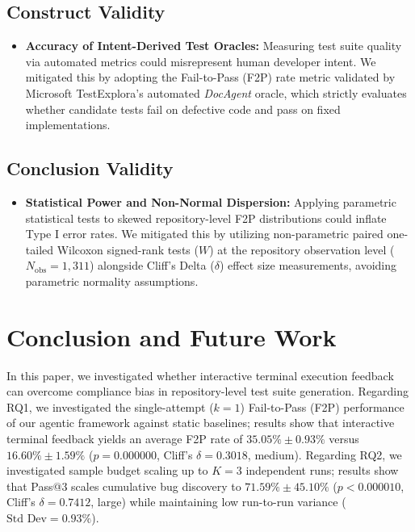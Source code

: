\documentclass[conference]{IEEEtran}
\begin{document}
\subsection{Construct Validity}
\begin{itemize}
    \item \textbf{Accuracy of Intent-Derived Test Oracles:} Measuring test suite quality via automated metrics could misrepresent human developer intent. We mitigated this by adopting the Fail-to-Pass (F2P) rate metric validated by Microsoft TestExplora's automated \textit{DocAgent} oracle, which strictly evaluates whether candidate tests fail on defective code and pass on fixed implementations.
\end{itemize}

\subsection{Conclusion Validity}
\begin{itemize}
    \item \textbf{Statistical Power and Non-Normal Dispersion:} Applying parametric statistical tests to skewed repository-level F2P distributions could inflate Type I error rates. We mitigated this by utilizing non-parametric paired one-tailed Wilcoxon signed-rank tests ($W$) at the repository observation level ($N_{\text{obs}} = 1,311$) alongside Cliff's Delta ($\delta$) effect size measurements, avoiding parametric normality assumptions.
\end{itemize}

\section{Conclusion and Future Work}
\label{sec:conclusion}

In this paper, we investigated whether interactive terminal execution feedback can overcome compliance bias in repository-level test suite generation. Regarding RQ1, we investigated the single-attempt ($k=1$) Fail-to-Pass (F2P) performance of our agentic framework against static baselines; results show that interactive terminal feedback yields an average F2P rate of $35.05\% \pm 0.93\%$ versus $16.60\% \pm 1.59\%$ ($p = 0.000000$, Cliff's $\delta = 0.3018$, medium). Regarding RQ2, we investigated sample budget scaling up to $K=3$ independent runs; results show that Pass@3 scales cumulative bug discovery to $71.59\% \pm 45.10\%$ ($p < 0.000010$, Cliff's $\delta = 0.7412$, large) while maintaining low run-to-run variance ($\text{Std Dev} = 0.93\%$).
\end{document}
